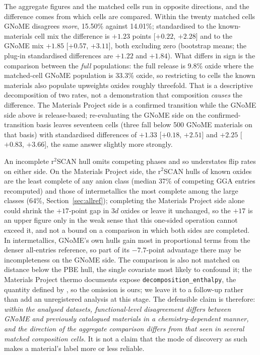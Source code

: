 \documentclass[11pt]{article}
\begin{document}
The aggregate figures and the matched cells run in opposite directions, and the
difference comes from which cells are compared. Within the twenty matched cells GNoME
disagrees \emph{more}, 15.50\% against 14.01\%; standardised to the known-materials
cell mix the difference is $+1.23$ points [$+0.22$, $+2.28$] and to the GNoME mix
$+1.85$ [$+0.57$, $+3.11$], both excluding zero (bootstrap means; the plug-in
standardised differences are $+1.22$ and $+1.84$). What differs in sign is the comparison
between the \emph{full} populations: the full release is 9.8\% oxide where the
matched-cell GNoME population is 33.3\% oxide, so restricting to cells the known
materials also populate upweights oxides roughly threefold. That is a descriptive
decomposition of two rates, not a demonstration that composition \emph{causes} the
difference. The Materials Project side is a confirmed transition while the GNoME side
above is release-based; re-evaluating the GNoME side on the confirmed-transition basis
leaves seventeen cells (three fall below 500 GNoME materials on that basis) with
standardised differences of $+1.33$ [$+0.18$, $+2.51$] and
$+2.25$ [$+0.83$, $+3.66$], the same answer slightly more strongly.

An incomplete
r$^2$SCAN hull omits competing phases and so understates flip rates on either side. On
the Materials Project side, the r$^2$SCAN hulls of known oxides are the least complete of
any anion class (median 37\% of competing GGA entries recomputed) and those of
intermetallics the most complete among the large classes (64\%,
Section~\ref{sec:allref}); completing the Materials Project side alone could shrink the
$+17$-point gap in 3$d$ oxides or leave it unchanged, so the $+17$ is an upper figure only in the weak sense that this one-sided operation
cannot exceed it, and not a bound on a comparison in which
both sides are completed. In intermetallics, GNoME's own hulls gain most in proportional terms from the denser
all-entries reference,
so part of its $-7.7$-point advantage there may be incompleteness on the GNoME side.
The comparison is also not matched on distance below the PBE hull, the single covariate
most likely to confound it; the Materials Project thermo documents expose
\texttt{decomposition\_enthalpy}, the quantity defined by \citet{bartel2019}, so the omission is ours; we leave it to a
follow-up rather than add an unregistered analysis at this stage. The defensible claim is therefore:
\emph{within the analysed datasets, functional-level disagreement differs between GNoME
and previously catalogued materials in a chemistry-dependent manner, and the direction
of the aggregate comparison differs from that seen in several matched composition
cells.} It is not a claim that the mode of discovery as such makes a material's label
more or less reliable.
\end{document}
